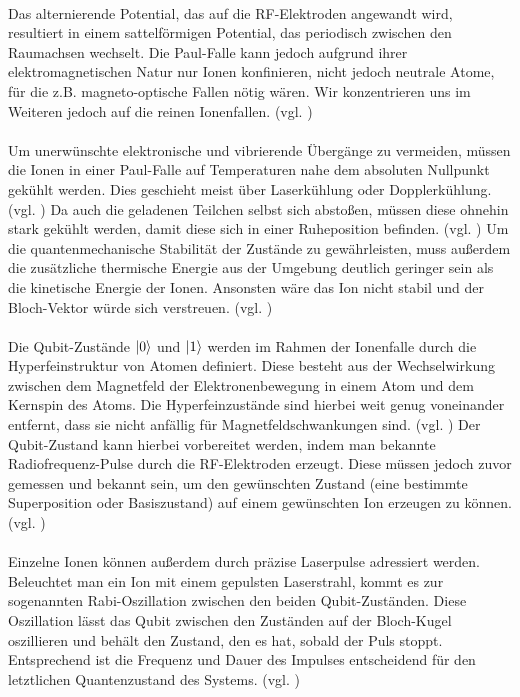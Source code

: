 \\
Das alternierende Potential, das auf die RF-Elektroden angewandt wird, resultiert in einem sattelförmigen Potential, das periodisch zwischen den Raumachsen wechselt. Die Paul-Falle kann jedoch aufgrund ihrer elektromagnetischen Natur nur Ionen konfinieren, nicht jedoch neutrale Atome, für die z.B. magneto-optische Fallen nötig wären. Wir konzentrieren uns im Weiteren jedoch auf die reinen Ionenfallen. (vgl. \cite[Ch. 21.1]{lapierre_getting_2022}) %
\\
\\
Um unerwünschte elektronische und vibrierende Übergänge zu vermeiden, müssen die Ionen in einer Paul-Falle auf Temperaturen nahe dem absoluten Nullpunkt gekühlt werden. Dies geschieht meist über Laserkühlung oder Dopplerkühlung. (vgl. \cite[Ch. 21.1]{lapierre_introduction_2021}) %
Da auch die geladenen Teilchen selbst sich abstoßen, müssen diese ohnehin stark gekühlt werden, damit diese sich in einer Ruheposition befinden. (vgl. \cite[Ch 10.4]{homeister_quantum_2022})
Um die quantenmechanische Stabilität der Zustände zu gewährleisten, muss außerdem die zusätzliche thermische Energie aus der Umgebung deutlich geringer sein als die kinetische Energie der Ionen. Ansonsten wäre das Ion nicht stabil und der Bloch-Vektor würde sich verstreuen. (vgl. \cite[Ch. 4.6.1]{kasirajan_fundamentals_2021}) %
\\
\\
Die Qubit-Zustände $\ket0$ und $\ket1$ werden im Rahmen der Ionenfalle durch die Hyperfeinstruktur von Atomen definiert. Diese besteht aus der Wechselwirkung zwischen dem Magnetfeld der Elektronenbewegung in einem Atom und dem Kernspin des Atoms. Die Hyperfeinzustände sind hierbei weit genug voneinander entfernt, dass sie nicht anfällig für Magnetfeldschwankungen sind. (vgl. \cite[Ch. 4.6.1]{kasirajan_fundamentals_2021}) %
Der Qubit-Zustand kann hierbei vorbereitet werden, indem man bekannte Radiofrequenz-Pulse durch die RF-Elektroden erzeugt. Diese müssen jedoch zuvor gemessen und bekannt sein, um den gewünschten Zustand (eine bestimmte Superposition oder Basiszustand) auf einem gewünschten Ion erzeugen zu können. (vgl. \cite[Ch.4.6.1]{kasirajan_fundamentals_2021}) %
\\
\\
Einzelne Ionen können außerdem durch präzise Laserpulse adressiert werden. Beleuchtet man ein Ion mit einem gepulsten Laserstrahl, kommt es zur sogenannten Rabi-Oszillation zwischen den beiden Qubit-Zuständen. Diese Oszillation lässt das Qubit zwischen den Zuständen auf der Bloch-Kugel oszillieren und behält den Zustand, den es hat, sobald der Puls stoppt. Entsprechend ist die Frequenz und Dauer des Impulses entscheidend für den letztlichen Quantenzustand des Systems. (vgl. \cite[Ch 21.1]{lapierre_introduction_2021}) %
